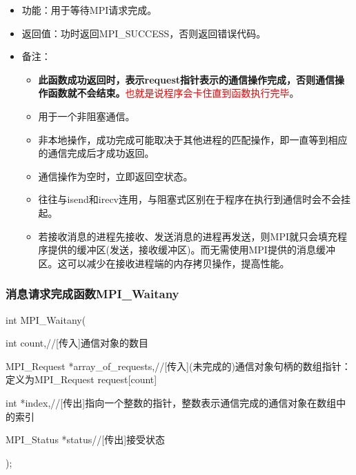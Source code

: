 \documentclass[UTF8]{article}%
\begin{document}
\begin{itemize}
    \item 功能：用于等待MPI请求完成。
    \item 返回值：功时返回MPI\_SUCCESS，否则返回错误代码。
    \item 备注：
    
    {
        \begin{itemize}
            \item \textbf{此函数成功返回时，表示request指针表示的通信操作完成，否则通信操作函数就不会结束。}\textcolor{red}{也就是说程序会卡住直到函数执行完毕}。
            \item 用于一个非阻塞通信。
            \item 非本地操作，成功完成可能取决于其他进程的匹配操作，即一直等到相应的通信完成后才成功返回。
            \item 通信操作为空时，立即返回空状态。
            \item 往往与isend和irecv连用，与阻塞式区别在于程序在执行到通信时会不会挂起。
            \item 若接收消息的进程先接收、发送消息的进程再发送，则MPI就只会填充程序提供的缓冲区(发送，接收缓冲区)。而无需使用MPI提供的消息缓冲区。这可以减少在接收进程端的内存拷贝操作，提高性能。
        \end{itemize}
    }

\end{itemize}

\subsubsection{消息请求完成函数MPI\_Waitany}

int MPI\_Waitany(

    \qquad int         count,//[传入]通信对象的数目

    \qquad MPI\_Request *array\_of\_requests,//[传入](未完成的)通信对象句柄的数组指针：定义为MPI\_Request request[count]

    \qquad int         *index,//[传出]指向一个整数的指针，整数表示通信完成的通信对象在数组中的索引

    \qquad MPI\_Status  *status//[传出]接受状态

);
\end{document}
